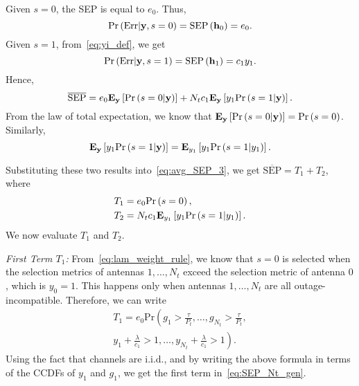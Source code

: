 \documentclass[journal]{IEEEtran}
\newcommand{\brac}[1]{\left({#1}\right)}
\newcommand{\explow}[2]{{\bf{E}}_{#1}\left[{#2}\right]}
\newcommand{\prob}[1]{\text{Pr}\brac{#1}}
\newcommand{\given}{\arrowvert}
\newcommand{\SEP}{\text{SEP}}
\newcommand{\y}{\mathbf{y}}
\newcommand{\nx}{{0}}
\newcommand{\lam}{\lambda}
\newcommand{\Err}{{\text{Err}}}
\newcommand{\termone}{T_1}
\newcommand{\termtwo}{T_2}
\newcommand{\Nt}{{N_t}}
\newcommand{\Pt}{{P_t}}
\newcommand{\such}{h}
\newcommand{\puch}{g}
\newcommand{\gk}[1]{{\puch_{#1}}}
\newcommand{\itau}{\tau}
\newcommand{\cone}{c_{1}}
\newcommand{\taubypt}{\frac{\itau}{\Pt}}
\newcommand{\lambycone}{\frac{\lam}{\cone}}
\newcommand{\yk}[1]{y_{#1}}
\newcommand{\zerosep}{e_0}
\newcommand{\avgSEP}{\overline{\SEP}}
\newcommand{\bhk}[1]{\mathbf{\such}_{#1}}
\begin{document}
Given $s=0$, the SEP is equal to $\zerosep$. Thus, 
\begin{equation}
\prob{\Err\given\y,s=\nx}=\SEP\left(\bhk{0}\right)=\zerosep.
\end{equation}
Given $s=1$,  from~\eqref{eq:yi_def}, we get 
\begin{equation}
\prob{\Err\given\y,s=1}=\SEP\left(\bhk{1}\right) =\cone \yk{1}.
\end{equation}
Hence,
%
\begin{equation}
\label{eq:avg_SEP_3}
\avgSEP  = \zerosep \explow{\y}{\prob{s=\nx\given\y}} + \Nt\cone\explow{\y}{\yk{1}\prob{s=1\given\y}}.
\end{equation}
%
From the law of total expectation, we know that $\explow{\y}{\prob{s=\nx\given\y}} = \prob{s = 0}$.
Similarly, 
\begin{equation}
\label{eq:avg_sep_3_one}
\explow{\y}{\yk{1}\prob{s = 1\given \y} } = \explow{\yk{1}}{\yk{1} \prob{s = 1\given \yk{1}}  }.
\end{equation}

Substituting these two results into~\eqref{eq:avg_SEP_3}, we get $\avgSEP  = \termone + \termtwo$,
%
where 
\begin{align}
\termone &=\zerosep \prob{s = 0},\\
\termtwo &=\Nt\cone \explow{\yk{1}}{ \yk{1}\prob{s = 1\given \yk{1}} }. 
\end{align}
%
We now evaluate $\termone$ and $\termtwo$.

{\em First Term $\termone$:}
From~\eqref{eq:lam_weight_rule}, we know that ${s=0}$ is selected when the selection metrics of antennas $1,\ldots,\Nt$ exceed the selection metric of antenna $0$, which is $\yk{0}=1$. This happens only when antennas $1,\ldots,\Nt$ are all outage-incompatible. Therefore, we can write
\begin{multline}
\termone =  \zerosep \text{Pr}\left(  \gk{1}>\taubypt,\dots,\gk{\Nt}>\taubypt, \right. \\ \left. \yk{1}+\lambycone >1,\ldots,\yk{\Nt}+\lambycone >1\right).
\label{eq:termone_a}
\end{multline}
%
Using the fact that channels are i.i.d., and by writing the above formula in terms of the CCDFs of $\yk{1}$ and $\gk{1}$, we get the first term in~\eqref{eq:SEP_Nt_gen}.
\end{document}
